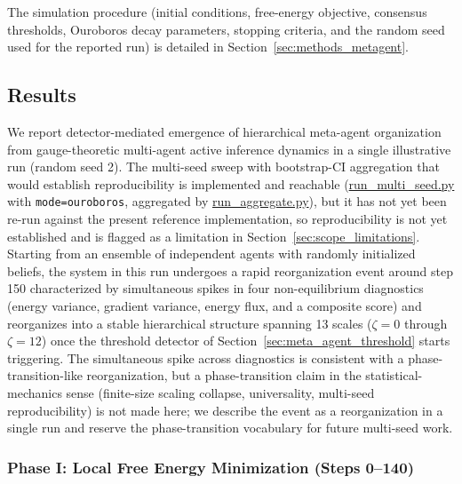 \documentclass[11pt]{article}
\begin{document}
The simulation procedure (initial conditions, free-energy objective, consensus thresholds, Ouroboros decay parameters, stopping criteria, and the random seed used for the reported run) is detailed in Section~\ref{sec:methods_metagent}.

\subsection{Results}

We report detector-mediated emergence of hierarchical meta-agent organization from gauge-theoretic multi-agent active inference dynamics in a single illustrative run (random seed 2). The multi-seed sweep with bootstrap-CI aggregation that would establish reproducibility is implemented and reachable (\url{run_multi_seed.py} with \texttt{mode=\textquotesingle ouroboros\textquotesingle}, aggregated by \url{run_aggregate.py}), but it has not yet been re-run against the present reference implementation, so reproducibility is not yet established and is flagged as a limitation in Section~\ref{sec:scope_limitations}. Starting from an ensemble of independent agents with randomly initialized beliefs, the system in this run undergoes a rapid reorganization event around step 150 characterized by simultaneous spikes in four non-equilibrium diagnostics (energy variance, gradient variance, energy flux, and a composite score) and reorganizes into a stable hierarchical structure spanning 13 scales ($\zeta = 0$ through $\zeta = 12$) once the threshold detector of Section~\ref{sec:meta_agent_threshold} starts triggering. The simultaneous spike across diagnostics is consistent with a phase-transition-like reorganization, but a phase-transition claim in the statistical-mechanics sense (finite-size scaling collapse, universality, multi-seed reproducibility) is not made here; we describe the event as a reorganization in a single run and reserve the phase-transition vocabulary for future multi-seed work.

\subsubsection{Phase I: Local Free Energy Minimization (Steps 0--140)}
\end{document}
